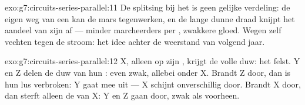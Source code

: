 \begin{solution}{exo:g7:circuits-series-parallel:11}
De splitsing bij het  is geen gelijke verdeling: de eigen
weg van een  kan de mars tegenwerken, en de lange dunne draad
knijpt het aandeel van zijn  af --- minder marcheerders per
, zwakkere gloed. Wegen zelf vechten tegen de stroom: het idee
achter de weerstand van volgend jaar.
\end{solution}

\begin{solution}{exo:g7:circuits-series-parallel:12}
X, alleen op zijn , krijgt de volle duw: het felst. Y en Z delen
de duw van hun  : even zwak, allebei onder X. Brandt
Z door, dan is hun lus verbroken: Y gaat mee uit --- X schijnt
onverschillig door. Brandt X door, dan sterft alleen de  van X:
Y en Z gaan door, zwak als voorheen.
\end{solution}

